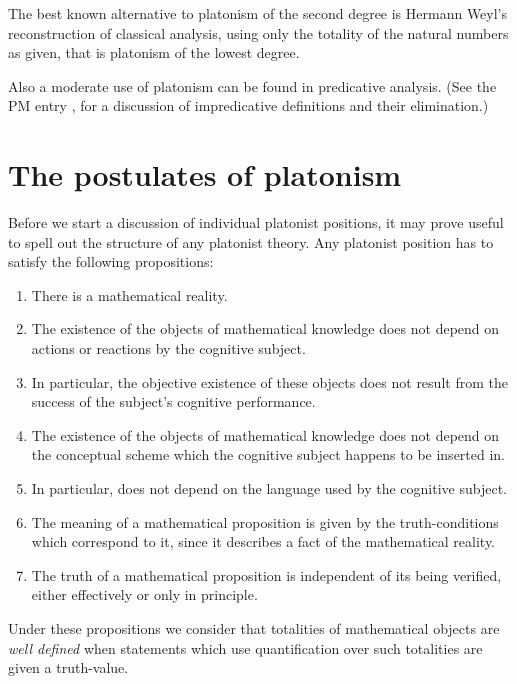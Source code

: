\documentclass[12pt]{article}
\begin{document}
The best known alternative to platonism of the second degree is Hermann Weyl's reconstruction of classical analysis, using only the totality of the natural numbers as given, that is platonism of the lowest degree.
 
Also a moderate use of platonism can be found in predicative analysis. (See the PM entry , for a discussion of impredicative definitions and their elimination.)

\section{The postulates of platonism}\normalsize

Before we start a discussion of individual platonist positions, it may prove useful to spell out the structure of any platonist theory. Any platonist position has to satisfy the following propositions:

\begin{enumerate}
\item There is a mathematical  reality.

\item The existence of the objects of mathematical knowledge does not depend on actions or reactions by the cognitive subject.

\item In particular, the objective existence of these objects does not result from the success of the subject's  cognitive performance.

\item The existence of the objects of mathematical knowledge does not depend on the conceptual scheme which the cognitive subject happens to be inserted in.

\item In particular, does not depend on the language used by the cognitive subject.

\item The meaning of a mathematical proposition is given by the truth-conditions which correspond to it, since it describes a fact of the mathematical reality.

\item The truth of a mathematical proposition is independent of its being verified, either effectively or only in principle.
\end{enumerate}

Under these propositions we consider that totalities of mathematical objects are \emph{well defined} when statements which use quantification over such totalities are given a truth-value.
\end{document}
